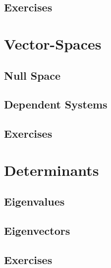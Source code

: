 \subsection{Exercises}

\newpage
\section{Vector-Spaces}
\subsection{Null Space}
\subsection{Dependent Systems}
\subsection{Exercises}

\newpage
\section{Determinants}
\subsection{Eigenvalues}
\subsection{Eigenvectors}
\subsection{Exercises}

\newpage
